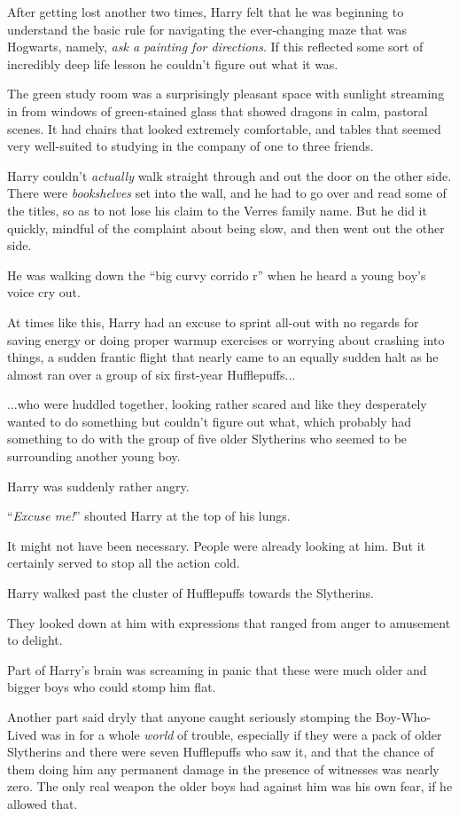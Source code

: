 After getting lost another two times, Harry felt that he was beginning to understand the basic rule for navigating the ever-changing maze that was Hogwarts, namely, \emph{ask a painting for directions}. If this reflected some sort of incredibly deep life lesson he couldn't figure out what it was.

The green study room was a surprisingly pleasant space with sunlight streaming in from windows of green-stained glass that showed dragons in calm, pastoral scenes. It had chairs that looked extremely comfortable, and tables that seemed very well-suited to studying in the company of one to three friends.

Harry couldn't \emph{actually} walk straight through and out the door on the other side. There were \emph{bookshelves} set into the wall, and he had to go over and read some of the titles, so as to not lose his claim to the Verres family name. But he did it quickly, mindful of the complaint about being slow, and then went out the other side.

He was walking down the ``big curvy corrido r'' when he heard a young boy's voice cry out.

At times like this, Harry had an excuse to sprint all-out with no regards for saving energy or doing proper warmup exercises or worrying about crashing into things, a sudden frantic flight that nearly came to an equally sudden halt as he almost ran over a group of six first-year Hufflepuffs...

...who were huddled together, looking rather scared and like they desperately wanted to do something but couldn't figure out what, which probably had something to do with the group of five older Slytherins who seemed to be surrounding another young boy.

Harry was suddenly rather angry.

``\emph{Excuse me!}'' shouted Harry at the top of his lungs.

It might not have been necessary. People were already looking at him. But it certainly served to stop all the action cold.

Harry walked past the cluster of Hufflepuffs towards the Slytherins.

They looked down at him with expressions that ranged from anger to amusement to delight.

Part of Harry's brain was screaming in panic that these were much older and bigger boys who could stomp him flat.

Another part said dryly that anyone caught seriously stomping the Boy-Who-Lived was in for a whole \emph{world} of trouble, especially if they were a pack of older Slytherins and there were seven Hufflepuffs who saw it, and that the chance of them doing him any permanent damage in the presence of witnesses was nearly zero. The only real weapon the older boys had against him was his own fear, if he allowed that.

